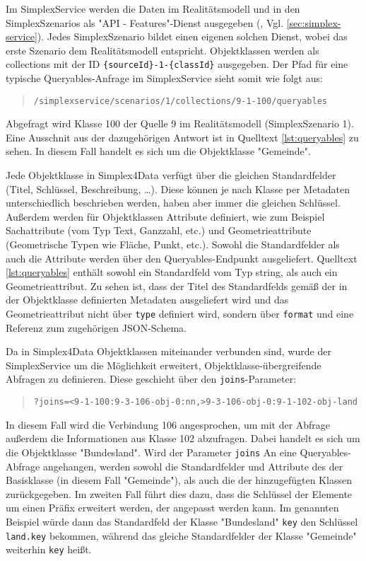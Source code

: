 

Im SimplexService werden die Daten im Realitätsmodell und in den SimplexSzenarios als "API - Features"-Dienst ausgegeben (\textcite{grossmannEnvVisioService2022}, Vgl. \ref{sec:simplex-service}). Jedes SimplexSzenario bildet einen eigenen solchen Dienst, wobei das erste Szenario dem Realitätsmodell entspricht. Objektklassen werden als collections mit der ID \texttt{\{sourceId\}-1-\{classId\}} ausgegeben. Der Pfad für eine typische Queryables-Anfrage im SimplexService sieht somit wie folgt aus:
\begin{quote}
  \texttt{/simplexservice/scenarios/1/collections/9-1-100/queryables}
\end{quote}
Abgefragt wird Klasse 100 der Quelle 9 im Realitätsmodell (SimplexSzenario 1). Eine Ausschnit aus der dazugehörigen Antwort ist in Quelltext \ref{lst:queryables} zu sehen. In diesem Fall handelt es sich um die Objektklasse "Gemeinde".

Jede Objektklasse in Simplex4Data verfügt über die gleichen Standardfelder (Titel, Schlüssel, Beschreibung, \dots). Diese können je nach Klasse per Metadaten unterschiedlich beschrieben werden, haben aber immer die gleichen Schlüssel. Außerdem werden für Objektklassen Attribute definiert, wie zum Beispiel Sachattribute (vom Typ Text, Ganzzahl, etc.) und Geometrieattribute (Geometrische Typen wie Fläche, Punkt, etc.). Sowohl die Standardfelder als auch die Attribute werden über den Queryables-Endpunkt ausgeliefert. Quelltext \ref{lst:queryables} enthält sowohl ein Standardfeld vom Typ string, als auch ein Geometrieattribut. Zu sehen ist, dass der Titel des Standardfelds gemäß der in der Objektklasse definierten Metadaten ausgeliefert wird und das Geometrieattribut nicht über \texttt{type}  definiert wird, sondern über \texttt{format} und eine Referenz zum zugehörigen \ac{JSON}-Schema.

Da in Simplex4Data Objektklassen miteinander verbunden sind, wurde der SimplexService um die Möglichkeit erweitert, Objektklasse-übergreifende Abfragen zu definieren. Diese geschieht über den \texttt{joins}-Parameter:
\begin{quote}
  \texttt{?joins=<9-1-100:9-3-106-obj-0:nn,>9-3-106-obj-0:9-1-102-obj-land}
\end{quote}
In diesem Fall wird die Verbindung 106 angesprochen, um mit der Abfrage außerdem die Informationen aus Klasse 102 abzufragen. Dabei handelt es sich um die Objektklasse "Bundesland". Wird der Parameter \texttt{joins} An eine Queryables-Abfrage angehangen, werden sowohl die Standardfelder und Attribute des der Basisklasse (in diesem Fall "Gemeinde"), als auch die der hinzugefügten Klassen zurückgegeben. Im zweiten Fall führt dies dazu, dass die Schlüssel der Elemente um einen Präfix erweitert werden, der angepasst werden kann. Im genannten Beispiel würde dann das Standardfeld der Klasse "Bundesland" \texttt{key} den Schlüssel \texttt{land.key} bekommen, während das gleiche Standardfelder der Klasse "Gemeinde" weiterhin \texttt{key} heißt.
